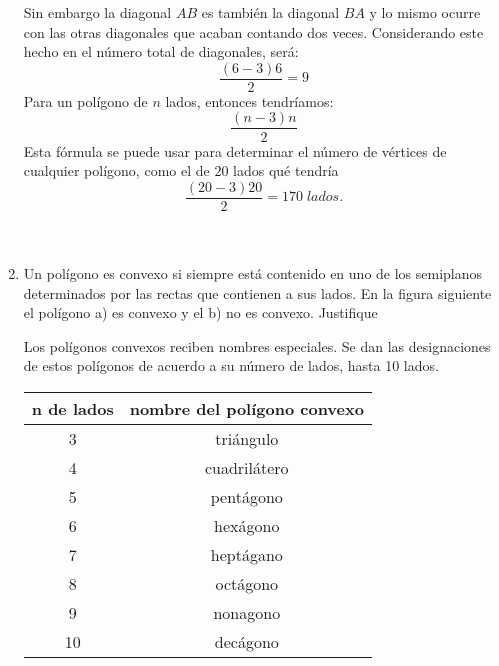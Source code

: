 \documentclass[10pt]{article}
\begin{document}
\begin{enumerate}
	\begin{center}
	\end{center}
	    Sin embargo la diagonal $AB$ es también la diagonal $BA$ y lo mismo ocurre con las otras diagonales que acaban contando dos veces. Considerando este hecho en el número total de diagonales, será: $$\dfrac{(6 - 3) 6}{2} = 9$$ Para un polígono de $n$ lados, entonces tendríamos: $$\dfrac{(n - 3)n}{2}$$ Esta fórmula se puede usar para determinar el número de vértices de cualquier polígono, como el de $20$ lados qué tendría $$\dfrac{(20 - 3) 20}{2} = 170 \; lados.$$\\\\

	\item Un polígono es convexo si siempre está contenido en uno de los semiplanos determinados por las rectas que contienen a sus lados. En la figura siguiente el polígono a) es convexo y el b) no es convexo. Justifique

	    \begin{multicols}{2}
		\begin{center}
		    
		\end{center}
	    \end{multicols}
	    Los polígonos convexos reciben nombres especiales. Se dan las designaciones de estos polígonos de acuerdo a su número de lados, hasta 10 lados.
	    \begin{center}
		\begin{tabular}{cc}
		    n de lados  &  nombre del polígono convexo\\
		    \hline
		     3 & triángulo \\
		     4 & cuadrilátero\\
		     5 & pentágono\\
		     6 & hexágono\\
		     7 & heptágano\\
		     8 & octágono\\
		     9 & nonagono\\
		     10& decágono\\
		\end{tabular}
	    \end{center}
	    

\end{enumerate}
\end{document}
